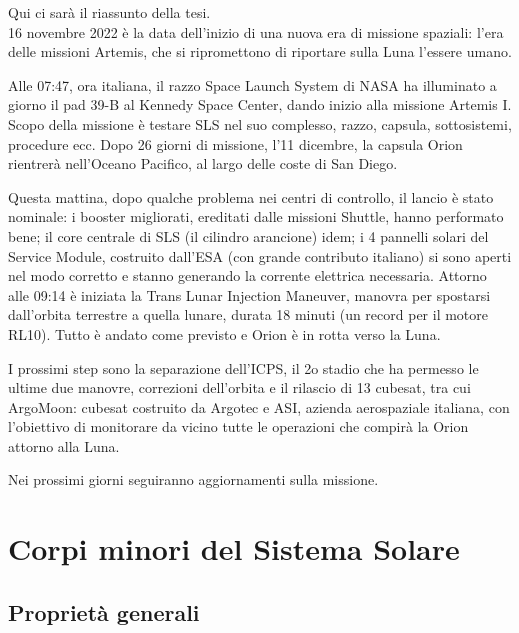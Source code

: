 \documentclass[a4paper,11pt,openright]{book}
\newenvironment{abstract}%
{\cleardoublepage%
\thispagestyle{empty}%
\null \vfill
\begin{center}%
\Huge \bfseries \abstractname 
\end{center}}%
{\vfill\null}
\begin{document}
\begin{abstract}    
Qui ci sarà il riassunto della tesi.\\
16 novembre 2022 è la data dell’inizio di una nuova era di missione spaziali: l’era delle missioni Artemis, che si ripromettono di riportare sulla Luna l’essere umano.

Alle 07:47, ora italiana, il razzo Space Launch System di NASA ha illuminato a giorno il pad 39-B al Kennedy Space Center, dando inizio alla missione Artemis I.
Scopo della missione è testare SLS nel suo complesso, razzo, capsula, sottosistemi, procedure ecc. 
Dopo 26 giorni di missione, l’11 dicembre, la capsula Orion rientrerà nell'Oceano Pacifico, al largo delle coste di San Diego.

Questa mattina, dopo qualche problema nei centri di controllo, il lancio è stato nominale: i booster migliorati, ereditati dalle missioni Shuttle, hanno performato bene; il core centrale di SLS (il cilindro arancione) idem; i 4 pannelli solari del Service Module, costruito dall’ESA (con grande contributo italiano) si sono aperti nel modo corretto e stanno generando la corrente elettrica necessaria.
Attorno alle 09:14 è iniziata la Trans Lunar Injection Maneuver, manovra per spostarsi dall'orbita terrestre a quella lunare, durata 18 minuti (un record per il motore RL10). Tutto è andato come previsto e Orion è in rotta verso la Luna.

I prossimi step sono la separazione dell'ICPS, il 2o stadio che ha permesso le ultime due manovre, correzioni dell’orbita e il rilascio di 13 cubesat, tra cui ArgoMoon: cubesat costruito da Argotec e ASI, azienda aerospaziale italiana, con l’obiettivo di monitorare da vicino tutte le operazioni che compirà la Orion attorno alla Luna.

Nei prossimi giorni seguiranno aggiornamenti sulla missione.
\end{abstract}



\tableofcontents

\listoftables

\listoffigures


\mainmatter

\chapter{Corpi minori del Sistema Solare}

\section{Proprietà generali}
\end{document}
